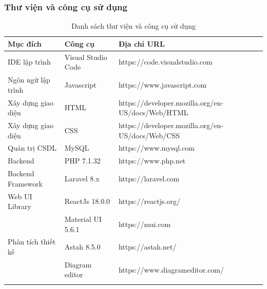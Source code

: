 \documentclass{article}
\begin{document}
\subsubsection{Thư viện và công cụ sử dụng}
    \begin{longtable}{| p{} | p{} | p{} |} 
    \hline
        \bfseries Mục đích & \bfseries Công cụ &\bfseries Địa chỉ URL\\\hline
        IDE lập trình& Visual Studio Code& https://code.visualstudio.com \\\hline
        Ngôn ngữ lập trình& Javascript& https://www.javascript.com \\\hline
        Xây dựng giao diện& HTML&https://developer.mozilla.org/en-US/docs/Web/HTML \\\hline
        Xây dựng giao diện& CSS& https://developer.mozilla.org/en-US/docs/Web/CSS \\\hline
        Quản trị CSDL& MySQL& https://www.mysql.com \\\hline
        Backend& PHP 7.1.32& https://www.php.net\\\hline
        Backend Framework& Laravel 8.x& https://laravel.com \\\hline
        Web UI Library& ReactJs 18.0.0&https://reactjs.org/\\\hline
                      & Material UI 5.6.1&https://mui.com \\\hline
        Phân tích thiết kế& Astah 8.5.0 & https://astah.net/ \\\hline
                          & Diagram editor& https://www.diagrameditor.com/ \\\hline
    \caption{Danh sách thư viện và công cụ sử dụng}
    \label{bang49}
    \end{longtable}
\end{document}
